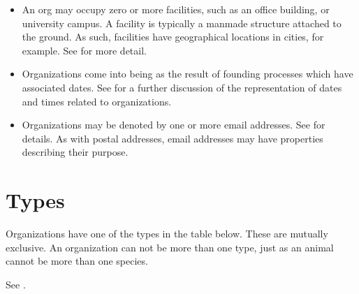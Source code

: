 \documentclass[letterpaper,10pt,english]{sphinxmanual}
\begin{document}
\begin{itemize}
\item {} 
\sphinxAtStartPar
An org may occupy zero or more facilities, such as an office building, or university
campus. A facility
is typically a man\sphinxhyphen{}made structure attached to the ground.  As such, facilities have
geographical locations \textendash{} in cities, for example.  See {\hyperref[\detokenize{facilities::doc}]{}}
for more detail.

\item {} 
\sphinxAtStartPar
Organizations come into being as the result of founding processes which have associated
dates.  See {\hyperref[\detokenize{datetimes::doc}]{}} for
a further discussion of the representation of dates and times related to organizations.

\item {} 
\sphinxAtStartPar
Organizations may be denoted by one or more email addresses.  See {\hyperref[\detokenize{addresses::doc}]{}} for details.  As with postal addresses, email addresses may have
properties describing their purpose.

\end{itemize}


\section{Types}
\label{\detokenize{organizations:types}}
\sphinxAtStartPar
Organizations have one of the types in the table below. These are mutually exclusive.
An organization can
not be more than one type, just as an animal cannot be more than one species.

\sphinxAtStartPar
See {\hyperref[\detokenize{organizations:table-1}]{}}.
\end{document}
